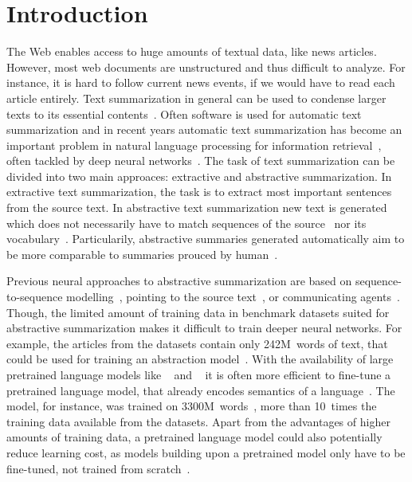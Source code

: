 \section{Introduction} %

The Web enables access to huge amounts of textual data, like news articles.
However, most web documents are unstructured and thus difficult to analyze.
For instance, it is hard to follow current news events, if we would have to read each article entirely.
Text summarization in general can be used to condense larger texts to its essential contents~\cite[xix]{Torres-Moreno2014}.
Often software is used for automatic text summarization and in recent years
automatic text summarization has become an important problem in natural language processing for information retrieval~\cite[xxi]{Torres-Moreno2014}, often tackled by deep neural networks~\cite{CelikyilmazBHC2018,LiuL2019,NallapatiZSGX2016,PaulusXS2018,SeeLM2017}.
The task of text summarization can be divided into two main approaces: extractive and abstractive summarization. In extractive text summarization, the task is to extract most important sentences from the source text. In abstractive text summarization new text is generated which does not necessarily have to match sequences of the source~\cite[28]{Torres-Moreno2014} nor its vocabulary~\cite{NallapatiZSGX2016}.
Particularily, abstractive summaries generated automatically aim to be more comparable to summaries prouced by human~\cite[220]{Torres-Moreno2014}.

Previous neural approaches to abstractive summarization are based on sequence-to-sequence modelling~\cite{NallapatiZSGX2016}, pointing to the source text~\cite{SeeLM2017}, or communicating agents~\cite{CelikyilmazBHC2018}.
Though, the limited amount of training data in benchmark datasets suited for abstractive summarization makes it difficult to train deeper neural networks.
For example, the articles from the \CnnDailyMail datasets contain only 242M~words of text, that could be used for training an abstraction model~\cite{HermannKGEKSB2015}.
With the availability of large pretrained language models like \Elmo~\cite{PetersNIGCLZ2018} and \Bert~\cite{DevlinCLT2019} it is often more efficient to fine-tune a pretrained language model, that already encodes semantics of a language~\cite{LiuL2019}.
The \Bert model, for instance, was trained on 3300M~words~\cite{DevlinCLT2019}, more than 10~times the training data available from the \CnnDailyMail datasets.
Apart from the advantages of higher amounts of training data, a pretrained language model could also potentially reduce learning cost, as models building upon a pretrained model only have to be fine-tuned, not trained from scratch~\cite{DevlinCLT2019}.

